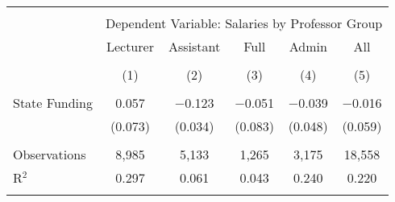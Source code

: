 
\begin{tabular}{@{\extracolsep{5pt}}lccccc} 
\\[-1.8ex]\hline 
\hline \\[-1.8ex] 
 & \multicolumn{5}{c}{Dependent Variable: Salaries by Professor Group} \\ 
\cline{2-6} 
 & Lecturer & Assistant & Full & Admin & All \\ 
\\[-1.8ex] & (1) & (2) & (3) & (4) & (5)\\ 
\hline \\[-1.8ex] 
 State Funding & 0.057 & $-$0.123 & $-$0.051 & $-$0.039 & $-$0.016 \\ 
  & (0.073) & (0.034) & (0.083) & (0.048) & (0.059) \\ 
 \hline \\[-1.8ex] 
Observations & 8,985 & 5,133 & 1,265 & 3,175 & 18,558 \\ 
R$^{2}$ & 0.297 & 0.061 & 0.043 & 0.240 & 0.220 \\ 
\hline 
\hline \\[-1.8ex] 
\end{tabular} 

